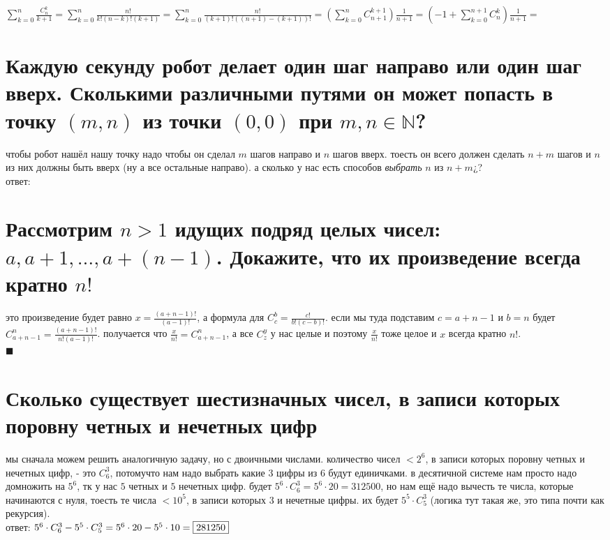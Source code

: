 \documentclass{article}
\newcommand{\ds}{\displaystyle}
\newcommand{\N}{\mathbb{N}}
\newcommand{\Cnk}[2]{C_{#1}^{#2}}
\renewcommand{\f}{\frac}
\renewcommand{\l}{\left}
\renewcommand{\r}{\right}
\begin{document}
  $\ds \sum_{k=0}^n\f{\Cnk{n}{k}}{k+1} = \sum_{k=0}^n\f{n!}{k!(n-k)!(k+1)} = \sum_{k=0}^n\f{n!}{(k+1)!\l((n+1)-(k+1)\r)!}
  = \l(\sum_{k=0}^n \Cnk{n+1}{k+1}\r)\f{1}{n+1} = \l(-1+\sum_{k=0}^{n+1} \Cnk{n}{k}\r)\f{1}{n+1} = $
  \fbox{$\ds \f{2^{n+1}-1}{n+1}$}

  \section{Каждую секунду робот делает один шаг направо или один шаг вверх. Сколькими различными путями он может попасть в точку $(m, n)$ из точки $(0, 0)$ при $m,n \in \N$?}
  чтобы робот нашёл нашу точку надо чтобы он сделал $m$ шагов направо и $n$ шагов вверх.
  тоесть он всего должен сделать $n+m$ шагов и $n$ из них должны быть вверх (ну а все остальные направо).
  а сколько у нас есть способов \textit{выбрать} $n$ из $n+m$¿? \\
  ответ: \fbox{$\Cnk{n+m}{n}$}

  \section{Рассмотрим $n > 1$ идущих подряд целых чисел: $a, a+1, \dots, a+(n-1)$. Докажите, что их произведение всегда кратно $n!$}
  это произведение будет равно $\ds x = \f{\l(a+n-1\r)!}{\l(a-1\r)!}$, а формула для $\ds \Cnk{c}{b} = \f{c!}{b!\l(c-b\r)!}$.
  если мы туда подставим $c=a+n-1$ и $b=n$ будет $\ds \Cnk{a+n-1}{n} = \f{\l(a+n-1\r)!}{n!\l(a-1\r)!}$.
  получается что $\ds \f{x}{n!} = \Cnk{a+n-1}{n}$, а все $\Cnk{z}{y}$ у нас целые и поэтому $\ds \f{x}{n!}$ тоже целое и $x$ всегда кратно $n!$. \\
  $\blacksquare$

  \section{Сколько существует шестизначных чисел, в записи которых поровну четных и нечетных цифр}
  мы сначала можем решить аналогичную задачу, но с двоичными числами.
  количество чисел $< 2^6$, в записи которых поровну четных и нечетных цифр, - это $\Cnk{6}{3}$,
  потомучто нам надо выбрать какие $3$ цифры из $6$ будут единичками.
  в десятичной системе нам просто надо домножить на $5^6$, тк у нас $5$ четных и $5$ нечетных цифр.
  будет $5^6\cdot\Cnk{6}{3} = 5^6 \cdot 20 = 312500$, но нам ещё надо вычесть те числа, которые начинаются с нуля,
  тоесть те числа $< 10^5$, в записи которых $3$ и нечетные цифры.
  их будет $5^5\cdot\Cnk{5}{3}$ (логика тут такая же, это типа почти как рекурсия). \\
  ответ: $5^6\cdot\Cnk{6}{3} - 5^5\cdot\Cnk{5}{3} = 5^6 \cdot 20 - 5^5 \cdot 10 = \fbox{281250}$
\end{document}

